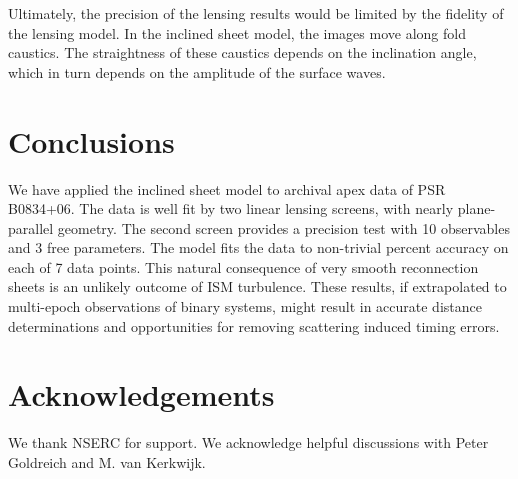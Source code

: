 \documentclass[useAMS,usenatbib]{mn2e}
\begin{document}
Ultimately, the precision of the lensing results would be limited by
the fidelity of the lensing model.  In the inclined sheet model, the
images move along fold caustics.  The straightness of these caustics
depends on the inclination angle, which in turn depends on the
amplitude of the surface waves.  

\section{Conclusions}

We have applied the \citep{2014MNRAS.442.3338P} inclined
sheet model to archival apex data of PSR B0834+06.  The data is well
fit by two linear lensing screens, with nearly plane-parallel
geometry.  The second screen provides a precision test with 10
observables and 3 free parameters.  The model fits the data to 
non-trivial percent accuracy on each of 7 data points.
This natural consequence of very smooth
reconnection sheets is an unlikely outcome of ISM turbulence.
These results, if extrapolated to multi-epoch observations of binary
systems, might result in accurate distance determinations and
opportunities for removing scattering induced timing errors.


\section{Acknowledgements}

We thank NSERC for support. We acknowledge helpful discussions with
Peter Goldreich and M. van Kerkwijk.


\newcommand{\araa}{ARA\&A}   %
\newcommand{\afz}{Afz}       %
\newcommand{\aj}{AJ}         %
\newcommand{\azh}{AZh}       %
\newcommand{\aaa}{A\&A}      %
\newcommand{\aas}{A\&AS}     %
\newcommand{\aar}{A\&AR}     %
\newcommand{\apj}{ApJ}       %
\newcommand{\apjs}{ApJS}     %
\newcommand{\apjl}{ApJ}      %
\newcommand{\apss}{Ap\&SS}   %
\newcommand{\baas}{BAAS}     %
\newcommand{\jaa}{JA\&A}     %
\newcommand{\mnras}{MNRAS}   %
\newcommand{\nat}{Nat}       %
\newcommand{\pasj}{PASJ}     %
\newcommand{\pasp}{PASP}     %
\newcommand{\paspc}{PASPC}   %
\newcommand{\qjras}{QJRAS}   %
\newcommand{\sci}{Sci}       %
\newcommand{\solphys}{Solar Physics}       %
\newcommand{\sova}{SvA}      %
\newcommand{\aap}{A\&A}
\newcommand\jcap{{J. Cosmology Astropart. Phys.}}%
\newcommand{\prd}{Phys. Rev. D}






\label{lastpage}
\end{document}
